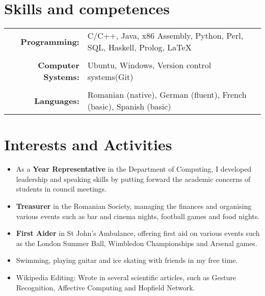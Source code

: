\documentclass[a4paper,10pt]{article} %
\begin{document}

\section*{Skills and competences}

\begin{tabular}{rl}
\textbf{Programming:} & C/C++, Java, x86 Assembly, Python, Perl, SQL, Haskell,
Prolog, {\LaTeX}\\
& \\
\textbf{Computer Systems:} & Ubuntu, Windows, Version control systems(Git)\\
& \\
\textbf{Languages:} & Romanian (native), German (fluent), French (basic), Spanish (basic)
\end{tabular}


\section*{Interests and Activities}
\begin{itemize}

 \item As a \textbf{Year Representative} in the Department of Computing, I developed leadership
and speaking skills by putting forward the academic concerns of students in
council meetings.\\
  
  \item \textbf{Treasurer} in the Romanian Society, managing the finances and
organising various events such as bar and cinema nights, football games and food
nights. \\

  \item \textbf{First Aider} in St John's Ambulance, offering first aid on various 
  events such as the London Summer Ball, Wimbledon Championships and Arsenal games.\\ 

  \item Swimming, playing guitar and ice skating with friends in my free time. \\
 
  \item Wikipedia Editing: Wrote in several scientific articles, such as Gesture Recognition, Affective Computing and Hopfield Network. \\
  
\end{itemize}




\end{document}
